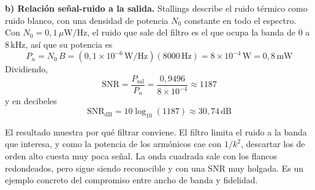 \documentclass[11pt,a4paper]{article}
\begin{document}
\noindent\textbf{b) Relación señal-ruido a la salida.} Stallings describe el ruido térmico como ruido blanco, con una densidad de potencia $N_0$ constante en todo el espectro. Con $N_0=0{,}1\,\mu\mathrm{W/Hz}$, el ruido que sale del filtro es el que ocupa la banda de $0$ a $8\,\mathrm{kHz}$, así que su potencia es
\[
  P_n=N_0\,B=(0{,}1\times10^{-6}\,\mathrm{W/Hz})(8000\,\mathrm{Hz})=8\times10^{-4}\,\mathrm{W}=0{,}8\,\mathrm{mW}
\]
Dividiendo,
\[
  \mathrm{SNR}=\frac{P_{\mathrm{sal}}}{P_n}=\frac{0{,}9496}{8\times10^{-4}}\approx1187
\]
y en decibeles
\[
  \mathrm{SNR}_{\mathrm{dB}}=10\log_{10}(1187)\approx\boxed{30{,}74\,\mathrm{dB}}
\]

El resultado muestra por qué filtrar conviene. El filtro limita el ruido a la banda que interesa, y como la potencia de los armónicos cae con $1/k^2$, descartar los de orden alto cuesta muy poca señal. La onda cuadrada sale con los flancos redondeados, pero sigue siendo reconocible y con una SNR muy holgada. Es un ejemplo concreto del compromiso entre ancho de banda y fidelidad.

\newpage
\end{document}
